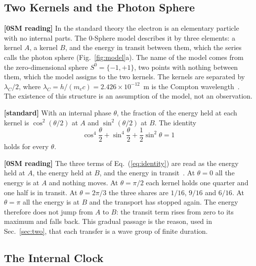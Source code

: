 \documentclass[%
 reprint, amsmath,amssymb, aps, prb, ]{revtex4-2}
\numberwithin{equation}{section}
\begin{document}
\subsection{Two Kernels and the Photon Sphere}
\label{app:split}

\textbf{[0SM reading]} In the standard theory the electron is an elementary particle with no internal parts. The 0-Sphere model describes it by three elements: a kernel $A$, a kernel $B$, and the energy in transit between them, which the series calls the photon sphere (Fig.~\ref{fig:model}a). The name of the model comes from the zero-dimensional sphere $S^0 = \{-1,+1\}$, two points with nothing between them, which the model assigns to the two kernels. The kernels are separated by $\lambda_C/2$, where $\lambda_C = h/(m_ec) = 2.426\times10^{-12}$~m is the Compton wavelength~\cite{H51}. The existence of this structure is an assumption of the model, not an observation.

\textbf{[standard]} With an internal phase $\theta$, the fraction of the energy held at each kernel is $\cos^2(\theta/2)$ at $A$ and $\sin^2(\theta/2)$ at $B$. The identity
\begin{equation}
\cos^4\frac{\theta}{2} + \sin^4\frac{\theta}{2} + \frac12\sin^2\theta = 1
\label{eq:identity}
\end{equation}
holds for every $\theta$.

\textbf{[0SM reading]} The three terms of Eq.~(\ref{eq:identity}) are read as the energy held at $A$, the energy held at $B$, and the energy in transit~\cite{H65}. At $\theta = 0$ all the energy is at $A$ and nothing moves. At $\theta = \pi/2$ each kernel holds one quarter and one half is in transit. At $\theta = 2\pi/3$ the three shares are $1/16$, $9/16$ and $6/16$. At $\theta = \pi$ all the energy is at $B$ and the transport has stopped again. The energy therefore does not jump from $A$ to $B$: the transit term rises from zero to its maximum and falls back. This gradual passage is the reason, used in Sec.~\ref{sec:two}, that each transfer is a wave group of finite duration.

\subsection{The Internal Clock}
\label{app:clock}
\end{document}
